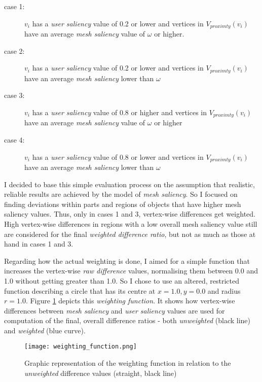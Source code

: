 \begin{description}
	\item [case 1:] $v_i$ has a \textit{user saliency} value of 0.2 or lower and vertices in $V_{proximty}(v_i)$ have an average \textit{mesh saliency} value of $\omega$ or higher.
	\item [case 2:] $v_i$ has a \textit{user saliency} value of 0.2 or lower and vertices in $V_{proximty}(v_i)$ have an average \textit{mesh saliency} lower than $\omega$
	\item [case 3:] $v_i$ has a \textit{user saliency} value of 0.8 or higher and vertices in $V_{proximty}(v_i)$ have an average \textit{mesh saliency} value of $\omega$ or higher
	\item [case 4:] $v_i$ has a \textit{user saliency} value of 0.8 or lower and vertices in $V_{proximty}(v_i)$ have an average \textit{mesh saliency} lower than $\omega$
\end{description}

I decided to base this simple evaluation process on the assumption that realistic, reliable results are achieved by the model of \textit{mesh saliency}. So I focused on finding deviations within parts and regions of objects that have higher mesh saliency values. Thus, only in cases 1 and 3, vertex-wise differences get weighted. High vertex-wise differences in regions with a low overall mesh saliency value still are considered for the final \textit{weighted difference ratio}, but not as much as those at hand in cases 1 and 3.

Regarding how the actual weighting is done, I aimed for a simple function that increases the vertex-wise \textit{raw difference} values, normalising them between 0.0 and 1.0 without getting greater than 1.0. So I chose to use an altered, restricted function describing a circle that has its centre at $x = 1.0, y = 0.0$ and radius $r = 1.0$. Figure \ref{fig:weighting_function} depicts this \textit{weighting function}. It shows how vertex-wise differences between \textit{mesh saliency} and \textit{user saliency} values are used for computation of the final, overall difference ratios - both \textit{unweighted} (black line) and \textit{weighted} (blue curve).

\begin{figure}[htb]
  \centering
  \texttt{[image: weighting\_function.png]}\\ %
  \caption{Graphic representation of the weighting function in relation to the \textit{unweighted} difference values (straight, black line)}\label{fig:weighting_function}
\end{figure}

